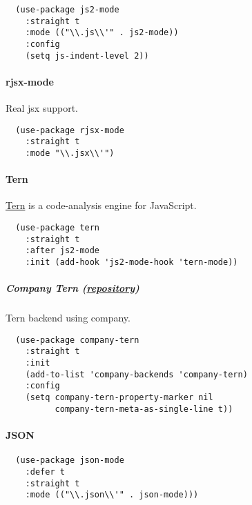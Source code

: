 \documentclass[11pt]{article}
\begin{document}
\begin{verbatim}
  (use-package js2-mode
    :straight t
    :mode (("\\.js\\'" . js2-mode))
    :config
    (setq js-indent-level 2))
\end{verbatim}

\paragraph*{rjsx-mode}
\label{sec:org01eb4cf}
Real jsx support.

\begin{verbatim}
  (use-package rjsx-mode
    :straight t
    :mode "\\.jsx\\'")
\end{verbatim}

\paragraph*{Tern}
\label{sec:orgd84b5ca}

\href{https://github.com/proofit404/company-tern}{Tern} is a code-analysis engine for JavaScript.

\begin{verbatim}
  (use-package tern
    :straight t
    :after js2-mode
    :init (add-hook 'js2-mode-hook 'tern-mode))
\end{verbatim}

\subparagraph*{Company Tern (\href{https://github.com/proofit404/company-tern}{repository})}
\label{sec:org576125f}

Tern backend using company.

\begin{verbatim}
  (use-package company-tern
    :straight t
    :init
    (add-to-list 'company-backends 'company-tern)
    :config
    (setq company-tern-property-marker nil
          company-tern-meta-as-single-line t))
\end{verbatim}

\paragraph*{JSON}
\label{sec:orgc3265b4}

\begin{verbatim}
  (use-package json-mode
    :defer t
    :straight t
    :mode (("\\.json\\'" . json-mode)))
\end{verbatim}
\end{document}
